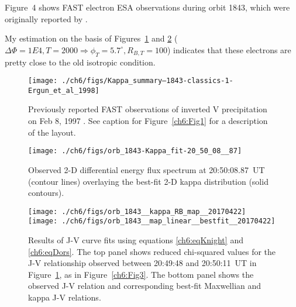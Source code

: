   Figure~4 shows FAST electron ESA observations during orbit 1843,
  which were originally reported by \citet{Ergun1998a}. 

  My estimation on the basis of Figures~\ref{ch6:Fig4} and \ref{ch6:Fig5}
  ($\Delta \Phi = 1E4, T = 2000 \Rightarrow \phi_T = 5.7^\circ,
  R_{B,T} = 100$) indicates that these electrons are pretty close to
  the old isotropic condition.


  \begin{figure}
    \centering
    \noindent\texttt{[image: ./ch6/figs/Kappa\_summary--1843-classics-1-Ergun\_et\_al\_1998]}
    \caption[Orbit 1843: Inverted V precipitation and best-fit
    Maxwellian and kappa distribution parameters]{Previously reported
      FAST observations of inverted V precipitation on Feb 8, 1997
      \citep{Ergun1998a}. See caption for Figure~\ref{ch6:Fig1} for a
      description of the layout.}
    \label{ch6:Fig4}
  \end{figure}



  \begin{figure}
    \centering
    \noindent\texttt{[image: ./ch6/figs/orb\_1843-Kappa\_fit-20\_50\_08\_\_87]}
    \caption[Orbit 1843: Example two-dimensional fit of an observed
    inverted-V electron distribution.]{Observed 2-D differential
      energy flux spectrum at 20:50:08.87~UT (contour lines)
      overlaying the best-fit 2-D kappa distribution (solid
      contours).}
    \label{ch6:Fig5}
  \end{figure}



  \begin{figure}
    \centering
    \noindent\texttt{[image: ./ch6/figs/orb\_1843\_\_kappa\_RB\_map\_\_20170422]}
    \noindent\texttt{[image: ./ch6/figs/orb\_1843\_\_map\_linear\_\_bestfit\_\_20170422]}
    \caption[Orbit 1843: Reduced chi-squared values for observed J-V
    curves and corresponding best-fit J-V curves.]{Results of J-V
      curve fits using equations \ref{ch6:eqKnight} and
      \ref{ch6:eqDors}. The top panel shows reduced chi-squared values
      for the J-V relationship observed between 20:49:48 and
      20:50:11~UT in Figure~\ref{ch6:Fig4}, as in
      Figure~\ref{ch6:Fig3}. The bottom panel shows the observed J-V
      relation and corresponding best-fit Maxwellian and kappa J-V relations.}
    \label{ch6:Fig6}
  \end{figure}

